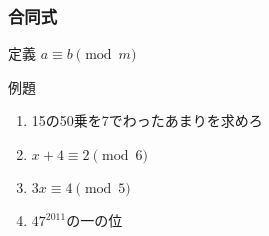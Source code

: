\documentclass[10pt,dvipdfmx]{jsarticle}
\begin{document}
\subsubsection*{合同式}
定義 $a\equiv b \pmod m$
\begin{itembox}[l]{例題}
  \begin{large}
    \begin{enumerate}
      \item 15の50乗を7でわったあまりを求めろ
      \item $x+4\equiv 2\pmod 6$
      \item $3x\equiv 4 \pmod 5$
      \item $47^2011$の一の位
    \end{enumerate}
  \end{large}
\end{itembox}
\end{document}
